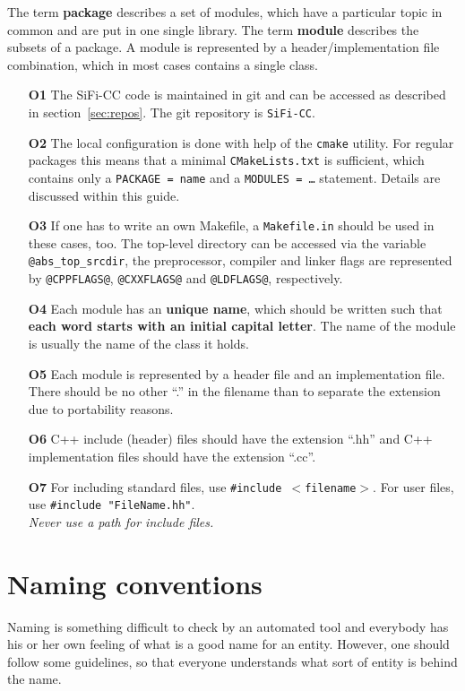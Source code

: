 \documentclass[a4paper,10pt]{article}
\newcommand{\sificc}{SiFi-CC\xspace}
\begin{document}
The term {\bf package} describes a set of modules, which have a
particular topic in common and are put in one single library.
The term {\bf module} describes the subsets of a package. A
module is represented by a header/implementation file combination,
which in most cases contains a single class.

\begin{itemize}
\item[\bf O1]
  The \sificc code is maintained in git and can be accessed as described in
  section~\ref{sec:repos}. The git repository is {\tt \sificc}.
\item[\bf O2]
  The local configuration is done with help of the {\tt cmake} utility.
  For regular packages this means that a minimal {\tt CMakeLists.txt}
  is sufficient, which contains only a {\tt PACKAGE = name} and a
  {\tt MODULES = \dots} statement. Details are discussed within this
  guide.
\item[\bf O3]
  If one has to write an own Makefile, a {\tt Makefile.in} should be
  used in these cases, too. The top-level directory can be accessed
  via the variable {\tt @abs\_top\_srcdir}, the preprocessor, compiler
  and linker flags are represented by {\tt @CPPFLAGS@}, {\tt @CXXFLAGS@}
  and {\tt @LDFLAGS@},
  respectively.
\item[\bf O4]
  Each module has an {\bf unique name}, which should be written
  such that {\bf each word starts with an initial capital letter}. The name
  of the module is usually the name of the class it holds.
\item[\bf O5]
  Each module is represented by a header file and an implementation
  file. There should be no other ``.'' in the filename than to separate the
  extension due to portability reasons.
\item[\bf O6]
  C++ include (header) files should have the extension ``.hh'' and
  C++ implementation files should have the extension ``.cc''.
\item[\bf O7]
  For including standard files, use {\tt \#include $<$filename$>$}.
  For user files, use {\tt \#include "FileName.hh"}.\\
  {\em Never use a path for include files.}
\end{itemize}

\section{Naming conventions}

Naming is something difficult to check by an automated tool and everybody has
his or her own feeling of what is a good name for an entity. However, one
should follow some guidelines, so that everyone understands what sort of
entity is behind the name.
\end{document}
